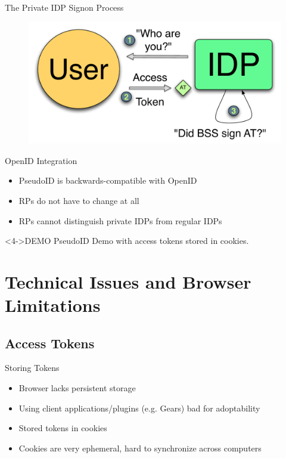 \documentclass[handout]{beamer}
\begin{document}
\begin{frame}{The Private IDP Signon Process}
  \begin{figure}
    \centering
    \includegraphics[scale=0.5]{figs/fig-bss-signon-color.pdf}
  \end{figure}
\end{frame}

\begin{frame}{OpenID Integration}

\begin{itemize}
  \item<1-> PseudoID is backwards-compatible with OpenID
  \item<2-> RPs do not have to change at all
  \item<3-> RPs cannot distinguish private IDPs from regular IDPs
\end{itemize}

\begin{alertblock}<4->{DEMO}
PseudoID Demo with access tokens stored in cookies.
\end{alertblock}
\end{frame}

\section[Technical Issues]{Technical Issues and Browser Limitations}

\subsection{Access Tokens}

\begin{frame}{Storing Tokens}
  \begin{itemize}
    \item<1-> Browser lacks persistent storage
    \item<2-> Using client applications/plugins (e.g. Gears) bad for adoptability
    \item<3-> Stored tokens in cookies
    \item<4-> Cookies are very ephemeral, hard to synchronize across computers
  \end{itemize}
\end{frame}
\end{document}
